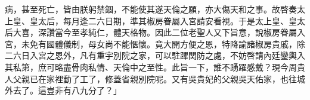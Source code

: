 病，甚至死亡，皆由朕躬禁錮，不能使其遂天倫之願，亦大傷天和之事。故啓奏太上皇、皇太后，每月逢二六日期，準其椒房眷屬入宮請安看視。于是太上皇、皇太后大喜，深讚當今至孝純仁，體天格物。因此二位老聖人又下旨意，說椒房眷屬入宮，未免有國體儀制，母女尚不能愜懷。竟大開方便之恩，特降諭諸椒房貴戚，除二六日入宮之恩外，凡有重宇別院之家，可以駐蹕関防之處，不妨啓請內廷鑾輿入其私第，庶可略盡骨肉私情、天倫中之至性。此旨一下，誰不踴躍感戴？現今周貴人父親已在家裡動了工了，修蓋省親別院呢。又有吳貴妃的父親吳天佑家，也往城外去了。這豈非有八九分了？」

\endinput